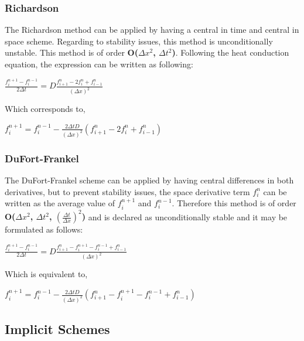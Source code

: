 \documentclass[12pt]{report}
\begin{document}
\subsubsection*{Richardson}
The Richardson method can be applied by having a central in time and central in space scheme. Regarding to stability issues, this method is unconditionally unstable. This method is of order \textbf{O($\Delta x ^2$, $\Delta t ^2$)}. Following the heat conduction equation, the expression can be written as following:
\begin{center}
\Large
$
\frac{f_i^{n + 1} - f_i^{n - 1}}{2 \Delta t} = D \frac{f_{i + 1}^{n} - 2f_{i}^{n} + f_{i - 1}^{n}}{(\Delta x)^2}
$
\end{center}
\par Which corresponds to,
\begin{center}
\Large
$
f_{i}^{n + 1} = f_{i}^{n - 1} - \frac{2\Delta t D}{(\Delta x)^2} (f_{i + 1}^{n} - 2 f_{i}^{n} + f_{i - 1}^{n})
$
\end{center}

\subsubsection*{DuFort-Frankel}
\par The DuFort-Frankel scheme can be applied by having central differences in both derivatives, but to prevent stability issues, the space derivative term $f_i^n$ can be written as the average value of $f_{i}^{n + 1}$ and $f_{i}^{n - 1}$. Therefore this method is of order \textbf{O($\Delta x ^2$, $\Delta t ^2$, $(\frac{\Delta t}{\Delta x}) ^2$)} and is declared as unconditionally stable and it may be formulated as follows:
\begin{center}
\Large
$
\frac{f_i^{n + 1} - f_i^{n - 1}}{2 \Delta t} = D \frac{f_{i + 1}^{n} - f_{i}^{n + 1} - f_{i}^{n - 1} + f_{i - 1}^{n}}{(\Delta x)^2}
$
\end{center}
\par Which is equivalent to,
\begin{center}
\Large
$
f_{i}^{n + 1} = f_{i}^{n - 1} - \frac{2\Delta t D}{(\Delta x)^2} (f_{i + 1}^{n} - f_{i}^{n + 1} - f_{i}^{n - 1} + f_{i - 1}^{n})
$
\end{center}

\subsection*{Implicit Schemes}
\end{document}
